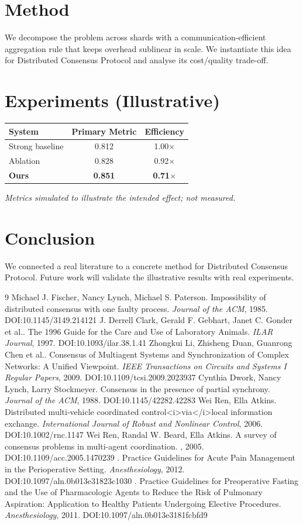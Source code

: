 \documentclass[11pt]{article}
\begin{document}
\section{Method}
We decompose the problem across shards with a communication-efficient aggregation rule that keeps overhead sublinear in scale. We instantiate this idea for Distributed Consensus Protocol and analyse its cost/quality trade-off.

\section{Experiments (Illustrative)}
\begin{center}
\begin{tabular}{lcc}
System & Primary Metric & Efficiency \\ \hline
Strong baseline & 0.812 & 1.00$\times$ \\
Ablation & 0.828 & 0.92$\times$ \\
\textbf{Ours} & \textbf{0.851} & \textbf{0.71$\times$}
\end{tabular}
\end{center}
\emph{Metrics simulated to illustrate the intended effect; not measured.}

\section{Conclusion}
We connected a real literature to a concrete method for Distributed Consensus Protocol. Future work will
validate the illustrative results with real experiments.

\begin{thebibliography}{9}
 Michael J. Fischer, Nancy Lynch, Michael S. Paterson. Impossibility of distributed consensus with one faulty process. \emph{Journal of the ACM}, 1985. DOI:10.1145/3149.214121
 J. Derrell Clark, Gerald F. Gebhart, Janet C. Gonder et al.. The 1996 Guide for the Care and Use of Laboratory Animals. \emph{ILAR Journal}, 1997. DOI:10.1093/ilar.38.1.41
 Zhongkui Li, Zhisheng Duan, Guanrong Chen et al.. Consensus of Multiagent Systems and Synchronization of Complex Networks: A Unified Viewpoint. \emph{IEEE Transactions on Circuits and Systems I Regular Papers}, 2009. DOI:10.1109/tcsi.2009.2023937
 Cynthia Dwork, Nancy Lynch, Larry Stockmeyer. Consensus in the presence of partial synchrony. \emph{Journal of the ACM}, 1988. DOI:10.1145/42282.42283
 Wei Ren, Ella Atkins. Distributed multi‐vehicle coordinated control<i>via</i>local information exchange. \emph{International Journal of Robust and Nonlinear Control}, 2006. DOI:10.1002/rnc.1147
 Wei Ren, Randal W. Beard, Ella Atkins. A survey of consensus problems in multi-agent coordination. \emph{}, 2005. DOI:10.1109/acc.2005.1470239
 . Practice Guidelines for Acute Pain Management in the Perioperative Setting. \emph{Anesthesiology}, 2012. DOI:10.1097/aln.0b013e31823c1030
 . Practice Guidelines for Preoperative Fasting and the Use of Pharmacologic Agents to Reduce the Risk of Pulmonary Aspiration: Application to Healthy Patients Undergoing Elective Procedures. \emph{Anesthesiology}, 2011. DOI:10.1097/aln.0b013e3181fcbfd9
\end{thebibliography}
\end{document}
